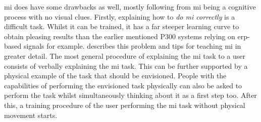 \Gls{mi} does have some drawbacks as well, mostly following from \gls{mi} being a cognitive process with no visual clues.
Firstly, explaining how to \textit{do \gls{mi} correctly} is a difficult task.
Whilst it can be trained, it has a far steeper learning curve to obtain pleasing results than the earlier mentioned P300 systems relying on \gls{erp}-based signals for example.
 describes this problem and tips for teaching \gls{mi} in greater detail.
The most general procedure of explaining the \gls{mi} task to a user consists of verbally explaining the \gls{mi} task.
This can be further supported by a physical example of the task that should be envisioned.
People with the capabilities of performing the envisioned task physically can also be asked to perform the task whilst simultaneously thinking about it as a first step too.
After this, a training procedure of the user performing the \gls{mi} task without physical movement starts.


